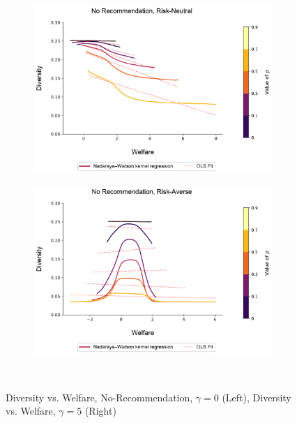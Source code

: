 \documentclass[format=acmsmall, review=false]{acmart}
\begin{document}
\begin{figure}[t]
\begin{subfigure}{.45\textwidth}
\includegraphics[width=1.05\linewidth]{figures/diversity_welfare_rn.pdf}
\end{subfigure}
\begin{subfigure}{.45\textwidth}
\includegraphics[width=1.05\linewidth]{figures/diversity_welfare_ra.pdf}
\end{subfigure}\\
\caption{Diversity vs. Welfare, No-Recommendation, $\gamma = 0$ (Left), Diversity vs. Welfare, $\gamma = 5$ (Right)}\label{fig:diversity_welfare_ra}
\end{figure}
\end{document}
